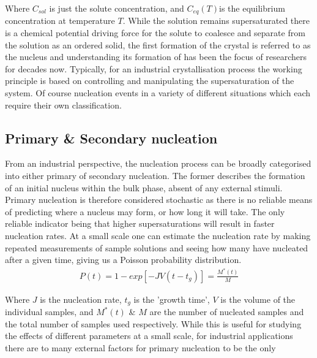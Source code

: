Where $C_{sol}$ is just the solute concentration, and $C_{eq}(T)$is the 
equilibrium concentration at temperature $T$. While the solution remains 
supersaturated there is a chemical potential driving force for the solute 
to coalesce and separate from the solution as an ordered solid, the first 
formation of the crystal is referred to as the nucleus and understanding its 
formation of has been the focus of researchers for decades now. Typically, 
for an industrial crystallisation process the working principle is based on 
controlling and manipulating the supersaturation of the system. Of course 
nucleation events in a variety of different situations which each require 
their own classification. 

\subsection{Primary \& Secondary nucleation}
From an industrial perspective, the nucleation process can be broadly 
categorised into either primary of secondary nucleation. The former 
describes the formation of an initial nucleus within the bulk phase, 
absent of any external stimuli. Primary nucleation is therefore considered 
stochastic as there is no reliable means of predicting where a nucleus
may form, or how long it will take. The only reliable indicator being 
that higher supersaturations will result in faster nucleation rates. At 
a small scale one can estimate the nucleation rate by making repeated 
measurements of sample solutions and seeing how many have nucleated 
after a given time, giving us a Poisson probability distribution.
\begin{align}
	P(t) = 1 - exp\left[-JV(t-t_g)\right] = \frac{M^*(t)}{M}
\end{align}

Where $J$ is the nucleation rate, $t_g$ is the 'growth time', $V$ is 
the volume of the individual samples, and $M^*(t)$ \& $M$ are the number 
of nucleated samples and the total number of samples used respectively.
While this is useful for studying the effects of different parameters at 
a small scale, for industrial applications there are to many external 
factors for primary nucleation to be the only 

